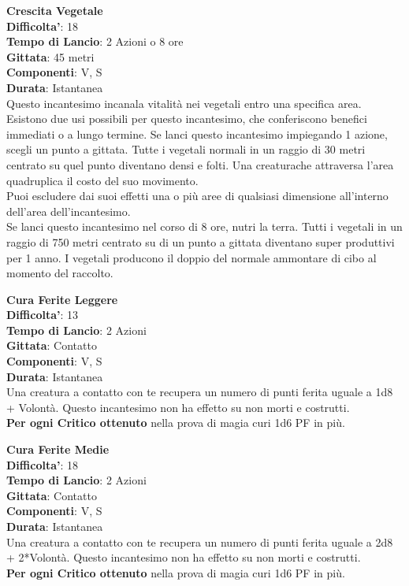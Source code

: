 \begin{multicols}{2}
\medskip\textbf{Crescita Vegetale}\\
\textbf{Difficolta'}: 18\\
\textbf{Tempo di Lancio}: 2 Azioni o 8 ore\\
\textbf{Gittata}: 45 metri\\
\textbf{Componenti}: V, S\\
\textbf{Durata}: Istantanea\\
Questo incantesimo incanala vitalità nei vegetali entro una specifica area. Esistono due usi possibili per questo incantesimo, che conferiscono benefici immediati o a lungo termine. Se lanci questo incantesimo impiegando 1 azione, scegli un punto a gittata. Tutte i vegetali normali in un  raggio di 30 metri centrato su quel punto diventano densi e folti. Una creaturache attraversa l’area quadruplica il costo del suo movimento.\\
Puoi escludere dai suoi effetti una o più aree di qualsiasi dimensione all’interno dell’area dell’incantesimo.\\
Se lanci questo incantesimo nel corso di 8 ore, nutri la terra. Tutti i vegetali in un raggio di 750 metri centrato su di un punto a gittata diventano super produttivi per 1 anno. I vegetali producono il doppio del normale ammontare di cibo al momento del raccolto.

\medskip\textbf{Cura Ferite Leggere}\\
\textbf{Difficolta'}: 13\\
\textbf{Tempo di Lancio}: 2 Azioni\\
\textbf{Gittata}: Contatto\\
\textbf{Componenti}: V, S\\
\textbf{Durata}: Istantanea\\
Una creatura a contatto con te recupera un numero di punti ferita uguale a 1d8 + Volontà. Questo incantesimo non ha effetto su non morti e costrutti.\\
\textbf{Per ogni Critico ottenuto} nella prova di magia curi 1d6 PF in più.

\medskip\textbf{Cura Ferite Medie}\\
\textbf{Difficolta'}: 18\\
\textbf{Tempo di Lancio}: 2 Azioni\\
\textbf{Gittata}: Contatto\\
\textbf{Componenti}: V, S\\
\textbf{Durata}: Istantanea\\
Una creatura a contatto con te recupera un numero di punti ferita uguale a 2d8 + 2*Volontà. Questo incantesimo non ha effetto su non morti e costrutti.\\
\textbf{Per ogni Critico ottenuto} nella prova di magia curi 1d6 PF in più.


\end{multicols}
